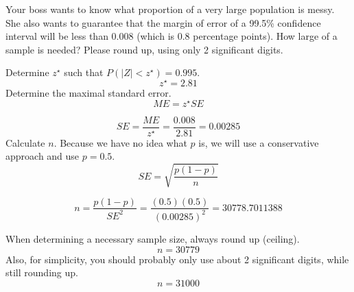 
\begin{question}
Your boss wants to know what proportion of a very large population is
messy. She also wants to guarantee that the margin of error of a 99.5\%
confidence interval will be less than 0.008 (which is 0.8 percentage
points). How large of a sample is needed? Please round up, using only 2
significant digits.
\end{question}

\begin{solution}
Determine \(z^\star\) such that \(P(|Z|<z^\star) = 0.995\).
\[z^\star = 2.81\] Determine the maximal standard error.
\[ME = z^\star SE \]

\[SE = \frac{ME}{z^\star} = \frac{0.008}{2.81} = 0.00285 \] Calculate
\(n\). Because we have no idea what \(p\) is, we will use a conservative
approach and use \(p=0.5\). \[SE = \sqrt{\frac{p(1-p)}{n}}\]

\[n = \frac{p(1-p)}{SE^2} = \frac{(0.5)(0.5)}{(0.00285)^2} = 30778.7011388\]

When determining a necessary sample size, always round up (ceiling).
\[n = 30779 \] Also, for simplicity, you should probably only use about
2 significant digits, while still rounding up. \[n = 31000 \]
\end{solution}

